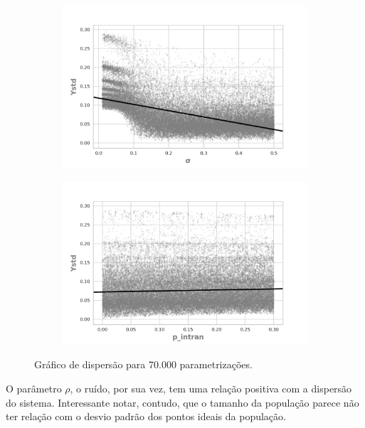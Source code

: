 \begin{figure}[H]
                \begin{subfigure}[b]{0.49\textwidth}
            \includegraphics[width=\textwidth]{ims/mutoregressions/regressionmutatingosigma.png}
          \end{subfigure}
                \begin{subfigure}[b]{0.49\textwidth}
            \includegraphics[width=\textwidth]{ims/mutoregressions/regressionmutatingop_intran.png}
    \end{subfigure}
    \caption{Gráfico de dispersão para 70.000 parametrizações.}
    \label{fig:scatter1}
\end{figure}

O parâmetro \(\rho\), o ruído, por sua vez, tem uma relação positiva com a
dispersão do sistema. Interessante notar, contudo, que o tamanho da população
parece não ter relação com o desvio padrão dos pontos ideais da população.

